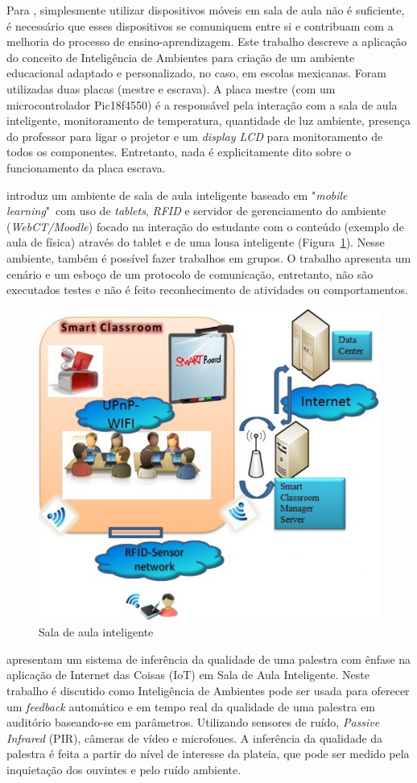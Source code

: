 Para \cite{Santana:2013}, simplesmente utilizar dispositivos móveis em sala de aula não é suficiente, é necessário que esses dispositivos se comuniquem entre si e contribuam com a melhoria do processo de ensino-aprendizagem. Este trabalho descreve a aplicação do conceito de Inteligência de Ambientes para criação de um ambiente educacional adaptado e personalizado, no caso, em escolas mexicanas. Foram utilizadas duas placas (mestre e escrava). A placa mestre (com um microcontrolador Pic18f4550) é a responsável pela interação com a sala de aula inteligente, monitoramento de temperatura, quantidade de luz ambiente, presença do professor para ligar o projetor e um \textit{display LCD} para monitoramento de todos os componentes. Entretanto, nada é explicitamente dito sobre o funcionamento da placa escrava.

\cite{Dekdouk:2012} introduz um ambiente de sala de aula inteligente baseado em "\textit{mobile learning}"~com uso de \textit{tablets}, \textit{RFID} e servidor de gerenciamento do ambiente (\textit{WebCT/Moodle}) focado na interação do estudante com o conteúdo (exemplo de aula de física) através do tablet e de uma lousa inteligente (Figura~\ref{fig:Dekdouk2012}). Nesse ambiente, também é possível fazer trabalhos em grupos. O trabalho apresenta um cenário e um esboço de um protocolo de comunicação, entretanto, não são executados testes e não é feito reconhecimento de atividades ou comportamentos.

\begin{figure}[ht]
	\centering
	\includegraphics[width=0.6\linewidth]{imgs/Dekdouk2012}
	\caption{Sala de aula inteligente}
	\label{fig:Dekdouk2012}
\end{figure}

\cite{Gligoric:2012} apresentam um sistema de inferência da qualidade de uma palestra com ênfase na aplicação de Internet das Coisas (IoT) em Sala de Aula Inteligente. Neste trabalho é discutido como Inteligência de Ambientes pode ser usada para oferecer um \textit{feedback} automático e em tempo real da qualidade de uma palestra em auditório baseando-se em parâmetros. Utilizando sensores de ruído, \textit{Passive Infrared} (PIR), câmeras de vídeo e microfones. A inferência da qualidade da palestra é feita a partir do nível de interesse da plateia, que pode ser medido pela inquietação dos ouvintes e pelo ruído ambiente. 
